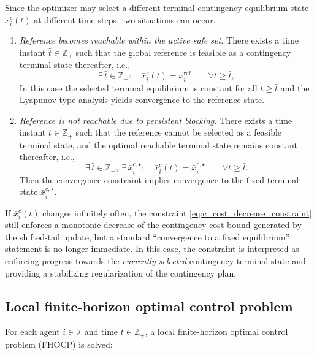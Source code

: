 \documentclass[twocolumn]{autart}
\begin{document}
\begin{remark}[Equilibrium]
\label{rem:tv_ss_case_split}
Since the optimizer may select a different terminal contingency equilibrium state $\bar{x}^c_i(t)$ at different time steps, two situations can occur.

\begin{enumerate}
\item[(i)] \emph{Reference becomes reachable within the active safe set.}
There exists a time instant $\bar{t}\in\mathbb{Z}_+$ such that the global reference is feasible as a
contingency terminal state thereafter, i.e.,
\[
\exists\,\bar{t}\in\mathbb{Z}_+:\quad
\bar{x}^{c}_i(t)=x_i^{\mathrm{ref}} \qquad \forall t\ge \bar{t},
\]
In this case the selected terminal equilibrium  is constant for all $t\ge\bar{t}$ and the Lyapunov-type analysis
yields convergence to the reference state.

\item[(ii)] \emph{Reference is not reachable due to persistent blocking.}
There exists a time instant $\bar{t}\in\mathbb{Z}_+$ such that the reference cannot be selected as a feasible terminal state, and the optimal reachable terminal state remains constant thereafter, i.e.,
\[
\exists\,\bar{t}\in\mathbb{Z}_+,\ \exists\,\bar{x}^{c,\star}_i:\quad
\bar{x}^{c}_i(t)=\bar{x}^{c,\star}_i \qquad \forall t\ge \bar{t}.
\]
Then the convergence constraint implies convergence to the fixed terminal state $\bar{x}^{c,\star}_i$.

\end{enumerate}

If $\bar{x}^c_i(t)$ changes infinitely often, the constraint \eqref{eq:c_cost_decrease_constraint}
still enforces a monotonic decrease of the contingency-cost bound generated by the shifted-tail update,
but a standard ``convergence to a fixed equilibrium'' statement is no longer immediate. In this case,
the constraint is interpreted as enforcing progress towards the \emph{currently selected} contingency
terminal state and providing a stabilizing regularization of the contingency plan.
\end{remark}

\subsection{Local finite-horizon optimal control problem}
\label{subsec:dcmpc_problem_statement}
For each agent $i\in\mathcal{I}$ and time $t\in\mathbb{Z}_+$, a local finite-horizon optimal control problem (FHOCP) is solved:
\end{document}

